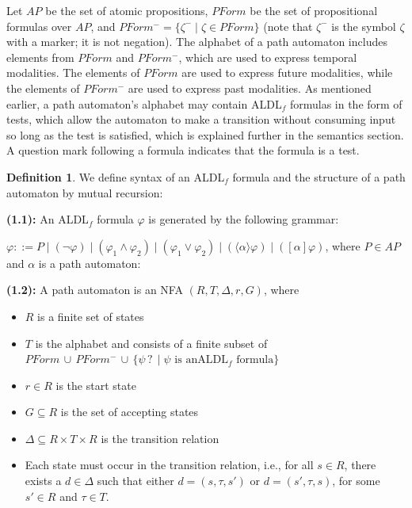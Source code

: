 \documentclass[10pt,a4paper]{amsart}
\theoremstyle{plain}
\theoremstyle{definition}
\newtheorem{definition}[thm]{Definition}
\theoremstyle{definition}
\newcommand{\dbox}[1]{\langle #1 \rangle}
\newcommand{\bbox}[1]{[ #1 ]}
\DeclareMathOperator{\?}{?}
\begin{document}
  Let $AP$ be the set of atomic propositions, $PForm$ be the set of propositional formulas over $AP$, and $PForm^- = \{ \zeta^- \mid \zeta \in PForm \}$ (note that $\zeta^-$ is the symbol $\zeta$ with a marker; it is not negation). The alphabet of a path automaton includes elements from
    $PForm$ and $PForm^-$, which are used to express temporal modalities. The elements of
    $PForm$ are used to express future modalities, while the elements of $PForm^-$ are used to
    express past modalities. As mentioned earlier, a path automaton's alphabet may contain ALDL$_f$ formulas in the form
    of tests, which allow the automaton to make a transition without consuming input so long as the test is
    satisfied, which is explained further in the semantics section.
    A question mark following a formula indicates that the formula is a test.

    \begin{definition}\label{def:aldlf_mutual} We define syntax of an ALDL$_f$ formula and the structure of a path
        automaton by mutual recursion:


    \textbf{(1.1):} An ALDL$_f$ formula $\varphi$ is generated by the following grammar:

  $\varphi ::= P \mid (\neg \varphi) \mid (\varphi_1 \wedge \varphi_2) \mid (\varphi_1 \vee \varphi_2)
  \mid (\dbox{\alpha} \varphi) \mid (\bbox{\alpha} \varphi)$, where $P \in AP$ and $\alpha$ is a path automaton:


    \textbf{(1.2):} A path automaton is an NFA $(R,T,\Delta,r,G)$, where
    \begin{itemize}
        \item $R$ is a finite set of states
        \item $T$ is the alphabet and consists of a finite subset of $PForm \, \cup \, PForm^- \, \cup \, \{ \psi \? \mid \psi \text{ is an} \allowbreak
        \text{ALDL$_f$ formula} \}$
        \item $r \in R$ is the start state
        \item $G \subseteq R$ is the set of accepting states
        \item $\Delta \subseteq R \times T \times R$ is the transition relation
        \item Each state must occur in the transition relation, i.e., for all $s \in R$, there exists a $d \in \Delta$ such that either $d = (s, \tau, s')$ or $d = (s', \tau, s)$, for some $s' \in R$ and $\tau \in T$.
    \end{itemize}

\end{definition}
\end{document}
